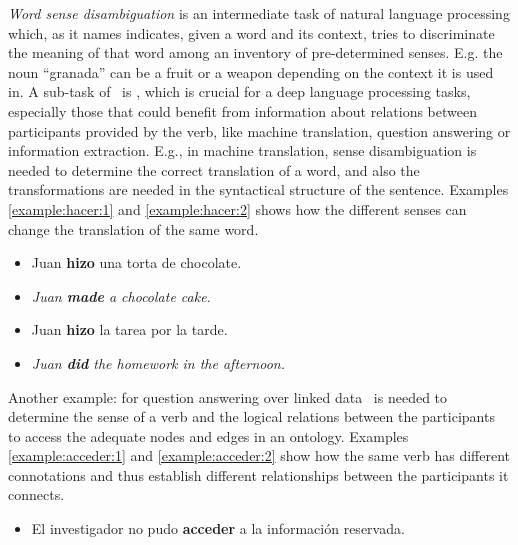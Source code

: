 {\em Word sense disambiguation} is an intermediate task of natural language
processing which, as it names indicates, given a word and its context, tries to
discriminate the meaning of that word among an inventory of pre-determined
senses. E.g. the noun ``granada'' can be a fruit or a weapon depending on the
context it is used in. A sub-task of \wsd~is {\em \vsd}, which is crucial for a
deep language processing tasks, especially those that could benefit from
information about relations between participants provided by the verb, like
machine translation, question answering or information extraction. E.g., in
machine translation, sense disambiguation is needed to determine the correct
translation of a word, and also the transformations are needed in the
syntactical structure of the sentence. Examples \ref{example:hacer:1} and
\ref{example:hacer:2} shows how the different senses can change the translation
of the same word.

\clearpage

\begin{example}\label{example:hacer:1}
  \begin{itemize}
    \item Juan {\bf hizo} una torta de chocolate.
    \item {\em Juan {\bf made} a chocolate cake.}
  \end{itemize}
\end{example}

\begin{example}\label{example:hacer:2}
  \begin{itemize}
    \item Juan {\bf hizo} la tarea por la tarde.
    \item {\em Juan {\bf did} the homework in the afternoon.}
  \end{itemize}
\end{example}

Another example: for question answering over linked data \vsd~is needed to
determine the sense of a verb and the logical relations between the
participants to access the adequate nodes and edges in an ontology. Examples
\ref{example:acceder:1} and \ref{example:acceder:2} show how the same verb has
different connotations and thus establish different relationships between the
participants it connects.

\begin{example}\label{example:acceder:1}
  \begin{itemize}
    \item El investigador no pudo {\bf acceder} a la informaci\'on reservada.
  \end{itemize}
\end{example}

